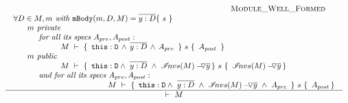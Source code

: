 $
\\ \\
\begin{array}{l}
\inferruleSD {  ~ \strut \hspace{3cm} {\sc{Module\_Well\_Formed}}}
{
\begin{array}{l} 
\forall  D\in M,  m   \textit{ with } \prg{mBody}(m,D,M)=\overline{y:D}\{\  s \ \}      \\
        ~ \strut \hspace{0.5cm} m \textit{ private}  \\ 
            ~ \strut \hspace{0.9cm} \textit{ for all its  specs } A_{pre},  A_{post}:\\ 
             ~\strut \hspace{2cm}
 					   {\hproves{M} { \ \prg{this}:\prg{D}\, \wedge\, \overline{y:D}\, \wedge\, A_{pre}\  } {\ s\ } {\ A_{post} \ } }\\
      ~ \strut \hspace{0.5cm} m \textit{ public}  \\ 
           ~ \strut \hspace{2cm}  { \hproves {M} {\ \prg{this}:\prg{D} \wedge\ \overline{y:D}   \ \wedge \ \PushAS {y} {\extract{M} } } {\ s\ } {\ \PushAS {y}{\extract{M}} } } \\
        ~ \strut \hspace{0.9cm} \textit{ and for all its  specs } A_{pre},  A_{post}:\\ 
             ~\strut \hspace{2cm}   
              ~ \strut \hspace{2cm}  { \hproves {M} {\ \prg{this}:\prg{D} \wedge\ \overline{y:D}  \ \wedge \ \PushAS {y} {\extract{M} } \ \wedge \ A_{pre}\ } {\ s\ } {\ A_{post} }  }
\end{array}
}					  					  
{   
	\ \vdash\ M \ 
}
\end{array}
$


